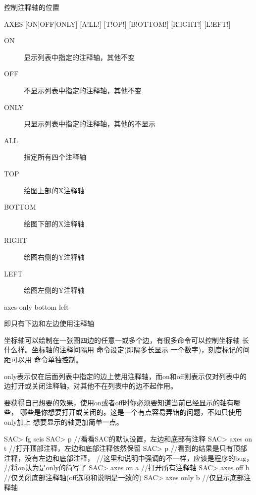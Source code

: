 \label{cmd:axes}

控制注释轴的位置

\begin{SACSTX}
AXES [ON|OFF|ONLY] [A!LL!] [T!OP!] [B!OTTOM!] [R!IGHT!] [L!EFT!]
\end{SACSTX}

\begin{description}
\item [ON] 显示列表中指定的注释轴，其他不变
\item [OFF] 不显示列表中指定的注释轴，其他不变
\item [ONLY] 只显示列表中指定的注释轴，其他的不显示
\item [ALL] 指定所有四个注释轴
\item [TOP] 绘图上部的X注释轴
\item [BOTTOM] 绘图下部的X注释轴
\item [RIGHT] 绘图右侧的Y注释轴
\item [LEFT] 绘图左侧的Y注释轴
\end{description}

\begin{SACDFT}
axes only bottom left
\end{SACDFT}
即只有下边和左边使用注释轴

坐标轴可以绘制在一张图四边的任意一或多个边，有很多命令可以控制坐标轴
长什么样。坐标轴的注释间隔用  命令设定(即隔多长显示
一个数字)，刻度标记的间距可以用  命令单独控制。

only表示仅在后面列表中指定的边上使用注释轴，而on和off则表示仅对列表中的
边打开或关闭注释轴，对其他不在列表中的边不起作用。

要获得自己想要的效果，使用on或者off时你必须要知道当前已经显示的轴有哪些，
哪些是你想要打开或关闭的。这是一个有点容易弄错的问题，不如只使用only加上
想要显示的轴更加简单一点。

\begin{SACCode}
SAC> fg seis
SAC> p           //看看SAC的默认设置，左边和底部有注释
SAC> axes on t   //打开顶部注释，左边和底部注释依然保留
SAC> p           //看到的结果是只有顶部注释，没有左边和底部注释，
                 //这里和说明中强调的不一样，应该是程序的bug，
                 //将on认为是only的简写了
SAC> axes on a   //打开所有注释轴
SAC> axes off b  //仅关闭底部注释轴(off选项和说明是一致的)
SAC> axes only b //仅显示底部注释轴
\end{SACCode}
